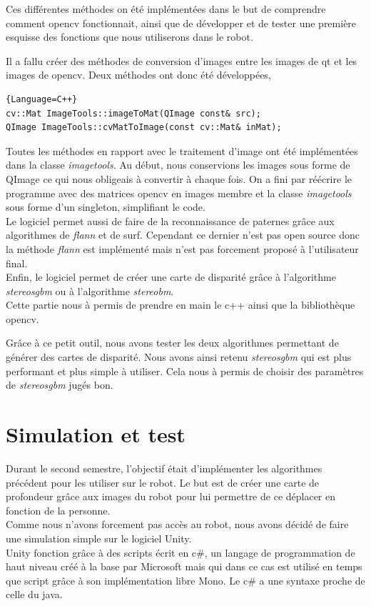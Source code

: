 \documentclass[12pt,a4paper]{report}
\begin{document}
Ces différentes méthodes on été implémentées dans le but de comprendre comment opencv fonctionnait, ainsi que de développer et de tester une première esquisse des fonctions que nous utiliserons dans le robot.

Il a fallu créer des méthodes de conversion d'images entre les images de qt et les images de opencv. Deux méthodes ont donc été développées,

\begin{lstlisting}{Language=C++}
cv::Mat ImageTools::imageToMat(QImage const& src);
QImage ImageTools::cvMatToImage(const cv::Mat& inMat);
\end{lstlisting}

Toutes les méthodes en rapport avec le traitement d'image ont été implémentées dans la classe \textit{imagetools}. Au début, nous conservions les images sous forme de QImage ce qui nous obligeais à convertir à chaque fois. On a fini par réécrire le programme avec des matrices opencv en images membre et la classe \textit{imagetools} sous forme d'un singleton, simplifiant le code.\\
Le logiciel permet aussi de faire de la reconnaissance de paternes grâce aux algorithmes de \textit{flann} et de surf. Cependant ce dernier n'est pas open source donc la méthode \textit{flann} est implémenté mais n'est pas forcement proposé à l'utilisateur final.\\
Enfin, le logiciel permet de créer une carte de disparité grâce à l'algorithme \textit{stereosgbm} ou à l'algorithme \textit{stereobm}.\\

Cette partie nous à permis de prendre en main le c++ ainsi que la bibliothèque opencv. 

Grâce à ce petit outil, nous avons tester les deux algorithmes permettant de générer des cartes de disparité. Nous avons ainsi retenu \textit{stereosgbm} qui est plus performant et plus simple à utiliser. Cela nous à permis de choisir des paramètres de \textit{stereosgbm} jugés bon.

\section{Simulation et test}
Durant le second semestre, l'objectif était d'implémenter les algorithmes précédent pour les utiliser sur le robot. Le but est de créer une carte de profondeur grâce aux images du robot pour lui permettre de ce déplacer en fonction de la personne.\\
Comme nous n'avons forcement pas accès au robot, nous avons décidé de faire une simulation simple sur le logiciel Unity.\\
Unity fonction grâce à des scripts écrit en c\#, un langage de programmation de haut niveau créé à la base par Microsoft mais qui dans ce cas est utilisé en temps que script grâce à son implémentation libre Mono. Le c\# a une syntaxe proche de celle du java.\\\\
\end{document}
